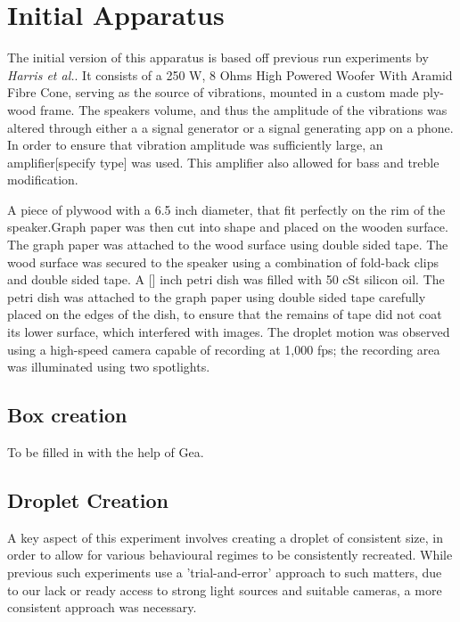 \section{Initial Apparatus}
The initial version of this apparatus is based  off previous run experiments by \textit{Harris et al.}. It consists of a 250 W, 8 Ohms High Powered Woofer With Aramid Fibre Cone, serving as the source of vibrations, mounted in a custom made ply-wood frame. The speakers volume, and thus the amplitude of the vibrations was altered through either a a signal generator or a signal generating app on a phone. In order to ensure that vibration amplitude was sufficiently large, an amplifier[specify type] was used. This amplifier also allowed for bass and treble modification. 

A piece of plywood with a 6.5 inch diameter, that fit perfectly on the rim of the speaker.Graph paper was then cut into shape and placed on the wooden surface. The graph paper was attached to the wood surface using double sided tape. The wood surface was secured to the speaker using a combination of fold-back clips and double sided tape. A [] inch petri dish was filled with 50 cSt silicon oil. The petri dish was attached to the graph paper using double sided tape carefully placed on the edges of the dish, to ensure that the remains of tape did not coat its lower surface, which interfered with images. The droplet motion was observed using a high-speed camera capable of recording at 1,000 fps; the recording area was illuminated using two spotlights. 

\subsection{Box creation}
To be filled in with the help of Gea.\\ 


\subsection{Droplet Creation}
A key aspect of this experiment involves creating a droplet of consistent size, in order to allow for various behavioural regimes to be consistently recreated. While previous such experiments use a 'trial-and-error' approach to such matters, due to our lack or ready access to strong light sources and suitable cameras, a more consistent approach was necessary.

